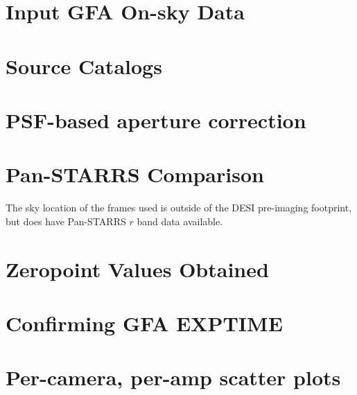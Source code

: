 \documentclass{article}
\begin{document}
\section{Input GFA On-sky Data}



\section{Source Catalogs}

\section{PSF-based aperture correction}


\section{Pan-STARRS Comparison}

The sky location of the frames used is outside of the DESI pre-imaging footprint, but does have Pan-STARRS $r$ band data available.

\section{Zeropoint Values Obtained}



\appendix

\section{Confirming GFA EXPTIME}

\section{Per-camera, per-amp scatter plots}
\end{document}
